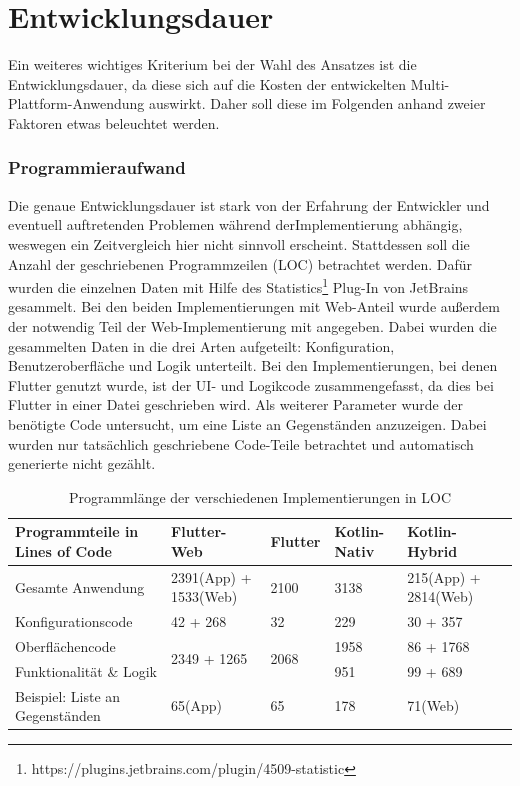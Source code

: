 \section{Entwicklungsdauer}
Ein weiteres wichtiges Kriterium bei der Wahl des Ansatzes ist die Entwicklungsdauer, da diese sich auf die Kosten der entwickelten Multi-Plattform-Anwendung auswirkt. Daher soll diese im Folgenden anhand zweier Faktoren etwas beleuchtet werden.

\subsubsection{Programmieraufwand}
Die genaue Entwicklungsdauer ist stark von der Erfahrung der Entwickler und eventuell auftretenden Problemen während derImplementierung abhängig, weswegen ein Zeitvergleich hier nicht sinnvoll erscheint. Stattdessen soll die Anzahl der geschriebenen Programmzeilen (LOC) betrachtet werden.
Dafür wurden die einzelnen Daten mit Hilfe des Statistics\footnote{https://plugins.jetbrains.com/plugin/4509-statistic} Plug-In von JetBrains gesammelt.
Bei den beiden Implementierungen mit Web-Anteil wurde außerdem der notwendig Teil der Web-Implementierung mit angegeben. 
Dabei wurden die gesammelten Daten in die drei Arten aufgeteilt: Konfiguration, Benutzeroberfläche und Logik unterteilt. 
Bei den Implementierungen, bei denen Flutter genutzt wurde, ist der UI- und Logikcode zusammengefasst, da dies bei Flutter in einer Datei geschrieben wird.
Als weiterer Parameter wurde der benötigte Code untersucht, um eine Liste an Gegenständen anzuzeigen.
Dabei wurden nur tatsächlich geschriebene Code-Teile betrachtet und automatisch generierte nicht gezählt.


\begin{table}[ht]
\centering
\caption[Programmlänge der verschiedenen Implementierungen in LOC]{Programmlänge der verschiedenen Implementierungen in LOC}
\begin{tabular}{ |p{4.5cm}||p{3cm}|p{2cm}|p{2cm}|p{3cm}|p{3cm}| }
 \hline
 Programmteile in Lines of Code & Flutter-Web & Flutter & Kotlin-Nativ & Kotlin-Hybrid \\
 \hline
 Gesamte Anwendung       &   2391(App) + 1533(Web) &   2100 & 3138 & 215(App) + 2814(Web)\\
  \hline
 Konfigurationscode  & 42 + 268& 32& 229& 30 + 357\\
  \hline
 Oberflächencode &\multirow{2}{*}{2349 + 1265}  &\multirow{2}{*}{2068}  & 1958& 86 + 1768\\
  \cline{1-1}
  \cline{4 -5}
 Funktionalität \& Logik & & & 951& 99 + 689\\
  \hline
 Beispiel: Liste an Gegenständen & 65(App) & 65 & 178 & 71(Web)\\
  \hline
\end{tabular}
\label{tab:lines_of_code}
\end{table}

